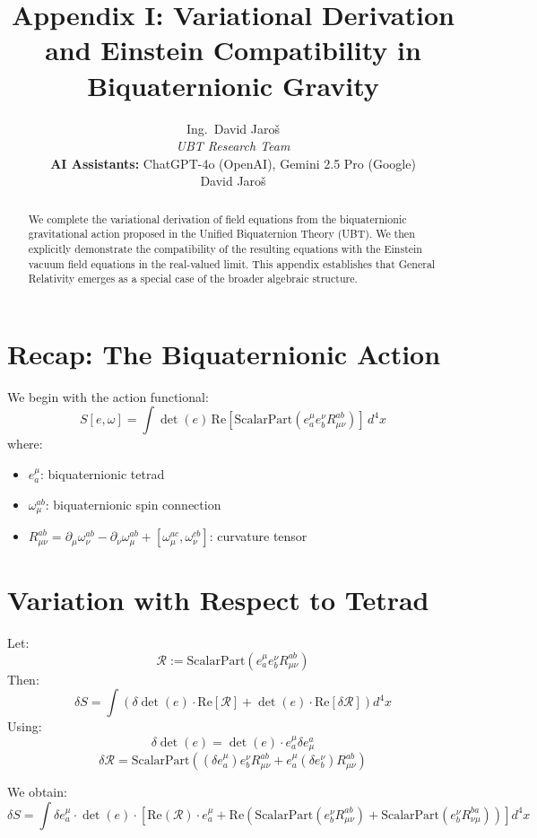 \documentclass[11pt]{article}
\title{\textbf{Appendix I: Variational Derivation and Einstein Compatibility in Biquaternionic Gravity}}
\author{
Ing.~David Jaroš \\
\textit{UBT Research Team} \\
\textbf{AI Assistants:} ChatGPT-4o (OpenAI), Gemini 2.5 Pro (Google) \\
David Jaroš}
\affil{Independent Researcher}
\date{}
\begin{document}
\maketitle

\begin{abstract}
We complete the variational derivation of field equations from the biquaternionic gravitational action proposed in the Unified Biquaternion Theory (UBT). We then explicitly demonstrate the compatibility of the resulting equations with the Einstein vacuum field equations in the real-valued limit. This appendix establishes that General Relativity emerges as a special case of the broader algebraic structure.
\end{abstract}

\section{Recap: The Biquaternionic Action}
We begin with the action functional:
\[
S[e,\omega] = \int \det(e) \, \text{Re}\left[\text{ScalarPart}(e^\mu_a e^\nu_b R_{\mu\nu}^{ab})\right] \, d^4x
\]
where:
\begin{itemize}
  \item \( e^\mu_a \): biquaternionic tetrad
  \item \( \omega_\mu^{ab} \): biquaternionic spin connection
  \item \( R_{\mu\nu}^{ab} = \partial_\mu \omega_\nu^{ab} - \partial_\nu \omega_\mu^{ab} + [\omega_\mu^{ac}, \omega_\nu^{cb}] \): curvature tensor
\end{itemize}

\section{Variation with Respect to Tetrad}

Let:
\[
\mathcal{R} := \text{ScalarPart}(e^\mu_a e^\nu_b R_{\mu\nu}^{ab})
\]
Then:
\[
\delta S = \int \left( \delta \det(e) \cdot \text{Re}[\mathcal{R}] + \det(e) \cdot \text{Re}[\delta \mathcal{R}] \right) d^4x
\]
Using:
\[
\delta \det(e) = \det(e) \cdot e^\mu_a \delta e^a_\mu
\]
\[
\delta \mathcal{R} = \text{ScalarPart}\left( (\delta e^\mu_a) e^\nu_b R_{\mu\nu}^{ab} + e^\mu_a (\delta e^\nu_b) R_{\mu\nu}^{ab} \right)
\]

We obtain:
\[
\delta S = \int \delta e^\mu_a \cdot \det(e) \cdot \left[ \text{Re}(\mathcal{R}) \cdot e^\mu_a + \text{Re}\left( \text{ScalarPart}(e^\nu_b R_{\mu\nu}^{ab}) + \text{ScalarPart}(e^\nu_b R_{\nu\mu}^{ba}) \right) \right] d^4x
\]
\end{document}
